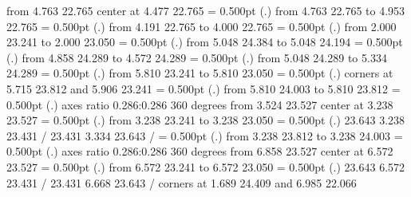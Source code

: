 {{	from  4.763 22.765 center at  4.477 22.765
}%
%
%
\linethickness= 0.500pt
\setplotsymbol ({\thinlinefont .})
{\color[rgb]{0,0,0}\putrule from  4.763 22.765 to  4.953 22.765
}%
%
%
\linethickness= 0.500pt
\setplotsymbol ({\thinlinefont .})
{\color[rgb]{0,0,0}\putrule from  4.191 22.765 to  4.000 22.765
}%
%
%
\linethickness= 0.500pt
\setplotsymbol ({\thinlinefont .})
{\color[rgb]{0,0,0}\putrule from  2.000 23.241 to  2.000 23.050
}%
%
%
\linethickness= 0.500pt
\setplotsymbol ({\thinlinefont .})
{\color[rgb]{0,0,0}\putrule from  5.048 24.384 to  5.048 24.194
}%
%
%
\linethickness= 0.500pt
\setplotsymbol ({\thinlinefont .})
{\color[rgb]{0,0,0}\putrule from  4.858 24.289 to  4.572 24.289
}%
%
%
\linethickness= 0.500pt
\setplotsymbol ({\thinlinefont .})
{\color[rgb]{0,0,0}\putrule from  5.048 24.289 to  5.334 24.289
}%
%
%
\linethickness= 0.500pt
\setplotsymbol ({\thinlinefont .})
{\color[rgb]{0,0,0}\putrule from  5.810 23.241 to  5.810 23.050
}%
%
%
\linethickness= 0.500pt
\setplotsymbol ({\thinlinefont .})
{\color[rgb]{0,0,0}\color[rgb]{0,0,0}\putrectangle corners at  5.715 23.812 and  5.906 23.241
}%
%
%
\linethickness= 0.500pt
\setplotsymbol ({\thinlinefont .})
{\color[rgb]{0,0,0}\putrule from  5.810 24.003 to  5.810 23.812
}%
%
%
\linethickness= 0.500pt
\setplotsymbol ({\thinlinefont .})
{\color[rgb]{0,0,0}\ellipticalarc axes ratio  0.286:0.286  360 degrees 
	from  3.524 23.527 center at  3.238 23.527
}%
%
%
\linethickness= 0.500pt
\setplotsymbol ({\thinlinefont .})
{\color[rgb]{0,0,0}\putrule from  3.238 23.241 to  3.238 23.050
}%
%
%
\linethickness= 0.500pt
\setplotsymbol ({\thinlinefont .})
{\color[rgb]{0,0,0} 23.643  3.238 23.431 /
 23.431  3.334 23.643 /
}%
%
%
\linethickness= 0.500pt
\setplotsymbol ({\thinlinefont .})
{\color[rgb]{0,0,0}\putrule from  3.238 23.812 to  3.238 24.003
}%
%
%
\linethickness= 0.500pt
\setplotsymbol ({\thinlinefont .})
{\color[rgb]{0,0,0}\ellipticalarc axes ratio  0.286:0.286  360 degrees 
	from  6.858 23.527 center at  6.572 23.527
}%
%
%
\linethickness= 0.500pt
\setplotsymbol ({\thinlinefont .})
{\color[rgb]{0,0,0}\putrule from  6.572 23.241 to  6.572 23.050
}%
%
%
\linethickness= 0.500pt
\setplotsymbol ({\thinlinefont .})
{\color[rgb]{0,0,0} 23.643  6.572 23.431 /
 23.431  6.668 23.643 /
}%
\linethickness=0pt
\putrectangle corners at  1.689 24.409 and  6.985 22.066
\endpicture}
